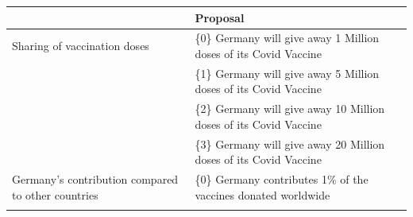 \documentclass[12pt,oneside,smallheadings,chapterprefix=true]{article}
\begin{document}
\begin{longtable}[]{@{}ll@{}}
\toprule
\begin{minipage}[b]{0.40\columnwidth}\raggedright
\strut
\end{minipage} & \begin{minipage}[b]{0.54\columnwidth}\raggedright
Proposal\strut
\end{minipage}\tabularnewline
\midrule
\endhead
\begin{minipage}[t]{0.40\columnwidth}\raggedright
Sharing of vaccination doses\strut
\end{minipage} & \begin{minipage}[t]{0.54\columnwidth}\raggedright
\{0\} Germany will give away 1 Million doses of its Covid Vaccine\strut
\end{minipage}\tabularnewline
\begin{minipage}[t]{0.40\columnwidth}\raggedright
\strut
\end{minipage} & \begin{minipage}[t]{0.54\columnwidth}\raggedright
\{1\} Germany will give away 5 Million doses of its Covid Vaccine\strut
\end{minipage}\tabularnewline
\begin{minipage}[t]{0.40\columnwidth}\raggedright
\strut
\end{minipage} & \begin{minipage}[t]{0.54\columnwidth}\raggedright
\{2\} Germany will give away 10 Million doses of its Covid Vaccine\strut
\end{minipage}\tabularnewline
\begin{minipage}[t]{0.40\columnwidth}\raggedright
\strut
\end{minipage} & \begin{minipage}[t]{0.54\columnwidth}\raggedright
\{3\} Germany will give away 20 Million doses of its Covid Vaccine\strut
\end{minipage}\tabularnewline
\begin{minipage}[t]{0.40\columnwidth}\raggedright
Germany's contribution compared to other countries\strut
\end{minipage} & \begin{minipage}[t]{0.54\columnwidth}\raggedright
\{0\} Germany contributes 1\% of the vaccines donated worldwide\strut
\end{minipage}\tabularnewline
\begin{minipage}[t]{0.40\columnwidth}\raggedright
\strut
\end{minipage} & \begin{minipage}[t]{0.54\columnwidth}\raggedright

\end{minipage}
\end{longtable}
\end{document}
